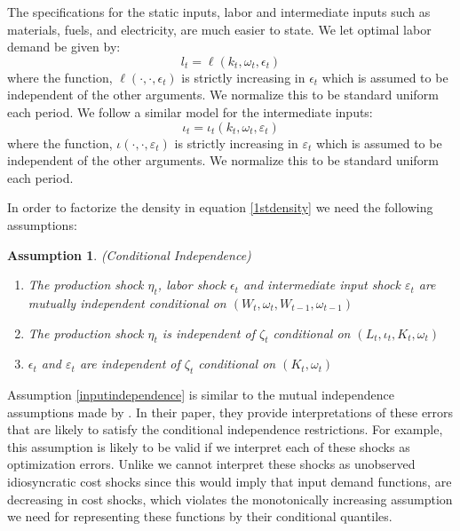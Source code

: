 \documentclass{article}
\newtheorem{assump}{Assumption}[subsection]
\begin{document}
The specifications for the static inputs, labor and intermediate inputs such as materials, fuels, and electricity, are much easier to state. We let optimal labor demand be given by:
\begin{equation} \label{labordemand}
l_{t}=\ell(k_{t}, \omega_{t}, \epsilon_{t})
\end{equation}
where the function, $\ell(\cdot, \cdot, \epsilon_{t})$ is strictly increasing in $\epsilon_{t}$ which is assumed to be independent of the other arguments. We normalize this to be standard uniform each period. We follow a similar model for the intermediate inputs:
\begin{equation} \label{intdemand}
\iota_{t}=\iota_{t}(k_{t}, \omega_{t}, \varepsilon_{t})
\end{equation}
where the function, $\iota(\cdot, \cdot, \varepsilon_{t})$ is strictly increasing in $\varepsilon_{t}$ which is assumed to be independent of the other arguments. We normalize this to be standard uniform each period.

In order to factorize the density in equation \eqref{1stdensity} we need the following assumptions:
\begin{assump}(Conditional Independence)\label{inputindependence}
~
    \begin{enumerate}[label=\alph*)]
        \item The production shock $\eta_{t}$, labor shock $\epsilon_{t}$ and intermediate input shock $\varepsilon_{t}$ are mutually independent conditional on $(W_{t}, \omega_{t}, W_{t-1}, \omega_{t-1})$
        \item The production shock $\eta_{t}$ is independent of $\zeta_{t}$ conditional on $(L_{t}, \iota_{t}, K_{t}, \omega_{t})$
        \item $\epsilon_{t}$ and $\varepsilon_{t}$ are independent of $\zeta_{t}$ conditional on $(K_{t}, \omega_{t})$
    \end{enumerate}
\end{assump}
Assumption \eqref{inputindependence} is similar to the mutual independence assumptions made by \cite{Hu2019}. In their paper, they provide interpretations of these errors that are likely to satisfy the conditional independence restrictions. For example, this assumption is likely to be valid if we interpret each of these shocks as optimization errors. Unlike \cite{Hu2019} we cannot interpret these shocks as unobserved idiosyncratic cost shocks since this would imply that input demand functions, are decreasing in cost shocks, which violates the monotonically increasing assumption we need for representing these functions by their conditional quantiles.\\
\end{document}

